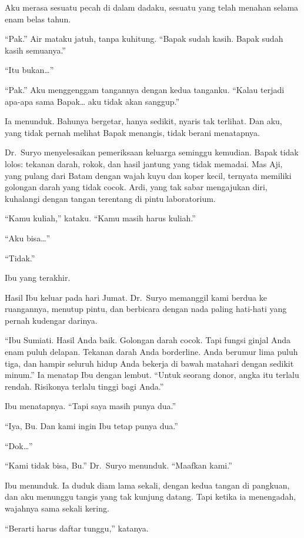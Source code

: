 \documentclass[11pt,twoside,openany]{book}
\begin{document}
Aku merasa sesuatu pecah di dalam dadaku, sesuatu yang telah menahan selama enam belas tahun.

``Pak.'' Air mataku jatuh, tanpa kuhitung. ``Bapak sudah kasih. Bapak sudah kasih semuanya.''

``Itu bukan\ldots{}''

``Pak.'' Aku menggenggam tangannya dengan kedua tanganku. ``Kalau terjadi apa-apa sama Bapak\ldots{} aku tidak akan sanggup.''

Ia menunduk. Bahunya bergetar, hanya sedikit, nyaris tak terlihat. Dan aku, yang tidak pernah melihat Bapak menangis, tidak berani menatapnya.

Dr.~Suryo menyelesaikan pemeriksaan keluarga seminggu kemudian. Bapak tidak lolos: tekanan darah, rokok, dan hasil jantung yang tidak memadai. Mas Aji, yang pulang dari Batam dengan wajah kuyu dan koper kecil, ternyata memiliki golongan darah yang tidak cocok. Ardi, yang tak sabar mengajukan diri, kuhalangi dengan tangan terentang di pintu laboratorium.

``Kamu kuliah,'' kataku. ``Kamu masih harus kuliah.''

``Aku bisa\ldots{}''

``Tidak.''

Ibu yang terakhir.

Hasil Ibu keluar pada hari Jumat. Dr.~Suryo memanggil kami berdua ke ruangannya, menutup pintu, dan berbicara dengan nada paling hati-hati yang pernah kudengar darinya.

``Ibu Sumiati. Hasil Anda baik. Golongan darah cocok. Tapi fungsi ginjal Anda enam puluh delapan. Tekanan darah Anda borderline. Anda berumur lima puluh tiga, dan hampir seluruh hidup Anda bekerja di bawah matahari dengan sedikit minum.'' Ia menatap Ibu dengan lembut. ``Untuk seorang donor, angka itu terlalu rendah. Risikonya terlalu tinggi bagi Anda.''

Ibu menatapnya. ``Tapi saya masih punya dua.''

``Iya, Bu. Dan kami ingin Ibu tetap punya dua.''

``Dok\ldots{}''

``Kami tidak bisa, Bu.'' Dr.~Suryo menunduk. ``Maafkan kami.''

Ibu menunduk. Ia duduk diam lama sekali, dengan kedua tangan di pangkuan, dan aku menunggu tangis yang tak kunjung datang. Tapi ketika ia menengadah, wajahnya sama sekali kering.

``Berarti harus daftar tunggu,'' katanya.
\end{document}
